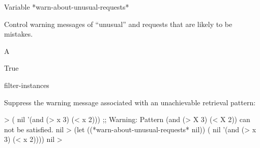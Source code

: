 \documentclass[10pt,twoside,english,pdftex]{article}
\begin{document}
\begin{functiondoc}{Variable}%
{*warn-about-unusual-requests*}{}%

\fnsyntax

\fnpurpose Control warning messages of ``unusual''
\textbf{} and \textbf{}
requests that are likely to be mistakes.

\fnpackage {}

\fnmodule {}

\fnvaluetype A 

\fninitialvalue True

\begin{alsos}{filter-instances}
\end{alsos}

\fnexample
Suppress the warning message associated with an unachievable retrieval pattern:
%
\W\supp
\begin{example}
  > ( nil '(and (> x 3) (< x 2)))
  ;; Warning: Pattern (and (> X 3) (< X 2)) can not be satisfied.
  nil
  > (let ((*warn-about-unusual-requests* nil))
      ( nil '(and (> x 3) (< x 2))))
  nil
  >
\end{example}

\end{functiondoc}

\end{document}
